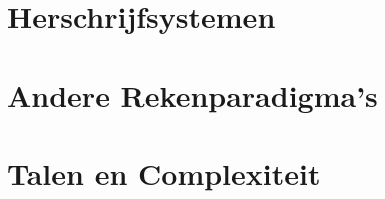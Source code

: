 \documentclass[
10pt,
a4paper,
oneside,
headinclude,footinclude, 
BCOR5mm,
]{scrartcl}
\begin{document}
\section{Herschrijfsystemen}

\lipsum[4-5]

\section{Andere Rekenparadigma's}

\lipsum[10]

\section{Talen en Complexiteit}

\lipsum[11]

\renewcommand{\refname}{\spacedlowsmallcaps{References}}




\end{document}
